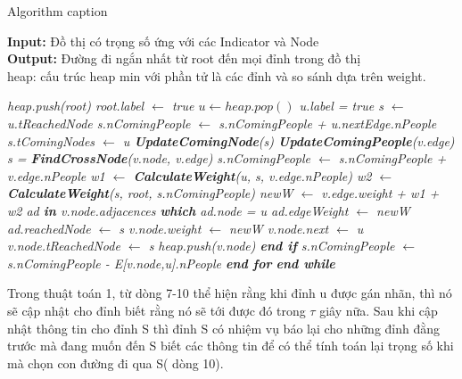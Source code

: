     \begin{algorithm}[!h]
    \caption{Algorithm caption}
    \label{alg:algorithm-label}
    \textbf{Input:} Đồ thị có trọng số ứng với các Indicator và Node\\
    \textbf{Output:} Đường đi ngắn nhất từ root đến mọi đỉnh trong đồ thị\\
    heap: cấu trúc heap min với phần tử là các đỉnh và so sánh dựa 
    trên weight.
    \begin{algorithmic}[1]
        \em
        \State heap.push(root)
        \State root.label $\gets$ true
        \State $u \gets heap.pop()$
        \State u.label = true
        \State s $\gets$ u.tReachedNode
        \State s.nComingPeople $\gets$ s.nComingPeople + u.nextEdge.nPeople
        \State s.tComingNodes $\gets$ u
        \State \textbf{UpdateComingNode}(s)
        \State \textbf{UpdateComingPeople}(v.edge)
        \EndFor
        \State s = \textbf{FindCrossNode}(v.node, v.edge)
        \State s.nComingPeople $\gets$ s.nComingPeople + v.edge.nPeople
        \State w1 $\gets$ \textbf{CalculateWeight}(u, s, v.edge.nPeople)
        \State w2 $\gets$ \textbf{CalculateWeight}(s, root, s.nComingPeople)
        \State newW $\gets$ v.edge.weight + w1 + w2
        \State ad \textbf{in} v.node.adjacences \textbf{which} ad.node = u
        \State ad.edgeWeight $\gets$ newW
        \State ad.reachedNode $\gets$ s
        \State v.node.weight $\gets$ newW
        \State v.node.next $\gets$ u 
        \State v.node.tReachedNode $\gets$ s
        \State heap.push(v.node)
        \EndIf
        \State \textbf{end if}
        \State s.nComingPeople $\gets$ s.nComingPeople - E[v.node,u].nPeople
        \EndFor
        \textbf{end for}
        \EndWhile
        \textbf{end while}
    \EndProcedure
    \end{algorithmic}
    \end{algorithm}

    Trong thuật toán 1, từ dòng 7-10 thể hiện rằng khi đỉnh u được gán nhãn, thì nó 
    sẽ cập nhật cho đỉnh biết rằng nó sẽ tới được đó trong $\tau$ giây nữa. Sau khi 
    cập nhật thông tin cho đỉnh S thì đỉnh S có nhiệm vụ báo lại cho những đỉnh đằng 
    trước mà đang muốn đến S biết các thông tin để có thể tính toán lại trọng số khi 
    mà chọn con đường đi qua S( dòng 10).

